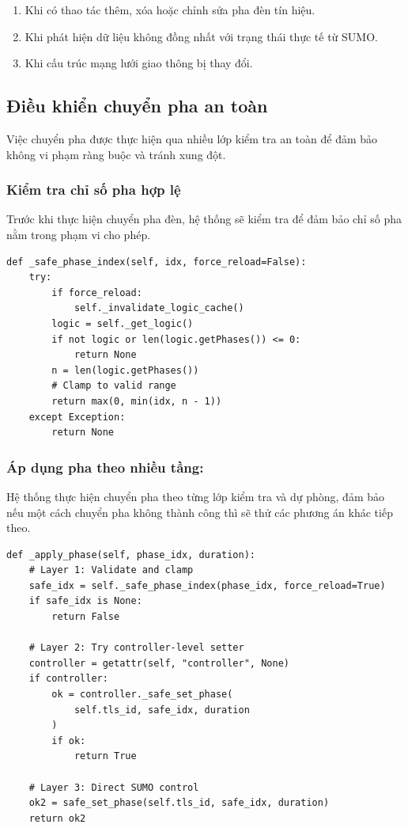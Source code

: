 \begin{enumerate}
    \item Khi có thao tác thêm, xóa hoặc chỉnh sửa pha đèn tín hiệu.
    \item Khi phát hiện dữ liệu không đồng nhất với trạng thái thực tế từ SUMO.
    \item Khi cấu trúc mạng lưới giao thông bị thay đổi.
\end{enumerate}

\subsection{Điều khiển chuyển pha an toàn}

Việc chuyển pha được thực hiện qua nhiều lớp kiểm tra an toàn để đảm bảo không vi phạm ràng buộc và tránh xung đột.

\subsubsection{Kiểm tra chỉ số pha hợp lệ}

Trước khi thực hiện chuyển pha đèn, hệ thống sẽ kiểm tra để đảm bảo chỉ số pha nằm trong phạm vi cho phép.

\begin{lstlisting}[style=py, caption={kẹp chỉ số pha hợp lệ}]
def _safe_phase_index(self, idx, force_reload=False):
    try:
        if force_reload:
            self._invalidate_logic_cache()
        logic = self._get_logic()
        if not logic or len(logic.getPhases()) <= 0:
            return None
        n = len(logic.getPhases())
        # Clamp to valid range
        return max(0, min(idx, n - 1))
    except Exception:
        return None
\end{lstlisting}

\subsubsection{Áp dụng pha theo nhiều tầng:}

Hệ thống thực hiện chuyển pha theo từng lớp kiểm tra và dự phòng, đảm bảo nếu một cách chuyển pha không thành công thì sẽ thử các phương án khác tiếp theo.
\begin{lstlisting}[style=py, caption={Quy trình áp dụng pha theo cấu trúc phân tầng}]
def _apply_phase(self, phase_idx, duration):
    # Layer 1: Validate and clamp
    safe_idx = self._safe_phase_index(phase_idx, force_reload=True)
    if safe_idx is None:
        return False
    
    # Layer 2: Try controller-level setter
    controller = getattr(self, "controller", None)
    if controller:
        ok = controller._safe_set_phase(
            self.tls_id, safe_idx, duration
        )
        if ok:
            return True
    
    # Layer 3: Direct SUMO control
    ok2 = safe_set_phase(self.tls_id, safe_idx, duration)
    return ok2
\end{lstlisting}

